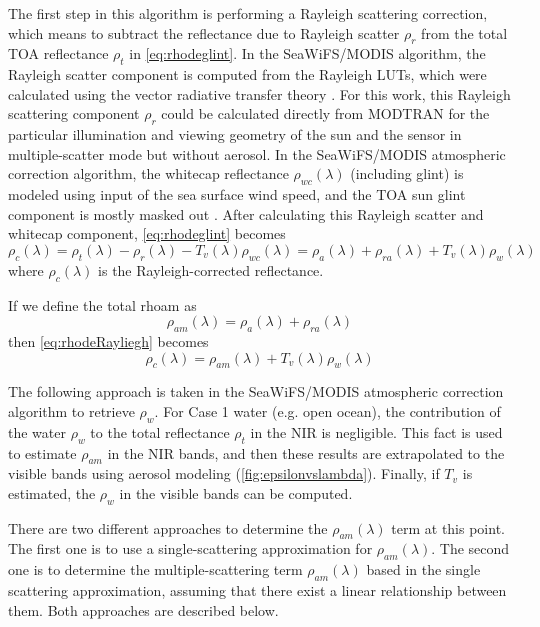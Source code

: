 The first step in this algorithm is performing a Rayleigh scattering correction, which means to subtract the reflectance due to Rayleigh scatter $\rho_r$ from the total TOA reflectance $\rho_t$ in \autoref{eq:rhodeglint}. In the SeaWiFS/MODIS algorithm, the Rayleigh scatter component is computed from the Rayleigh LUTs, which were calculated using the vector radiative transfer theory \cite{Wang:1991,IOCCG:2010}. For this work, this Rayleigh scattering component $\rho_r$ could be calculated directly from MODTRAN for the particular illumination and viewing geometry of the sun and the sensor in multiple-scatter mode but without aerosol. In the SeaWiFS/MODIS atmospheric correction algorithm, the whitecap reflectance $\rho_{wc}(\lambda)$ (including glint) is modeled using input of the sea surface wind speed, and the TOA sun glint component is mostly masked out \cite{IOCCG:2010}. After calculating this Rayleigh scatter and whitecap component, \autoref{eq:rhodeglint} becomes 
\begin{equation}\label{eq:rhodeRayliegh}
 \rho_c(\lambda) = \rho_t(\lambda)-\rho_r(\lambda)-T_v(\lambda)\rho_{wc}(\lambda) = \rho_a(\lambda)+\rho_{ra}(\lambda)+T_v(\lambda)\rho_{w}(\lambda)
\end{equation}
where $\rho_c(\lambda)$ is the Rayleigh-corrected reflectance. 

If we define the total \gls{rhoam} as
\begin{equation}\label{eq:rhoam1}
  \rho_{am}(\lambda) = \rho_a(\lambda)+\rho_{ra}(\lambda)
\end{equation}
then \autoref{eq:rhodeRayliegh} becomes
\begin{equation}\label{eq:rhoam}
 \rho_c(\lambda) = \rho_{am}(\lambda) + T_v(\lambda)\rho_{w}(\lambda)
\end{equation}

The following approach is taken in the SeaWiFS/MODIS atmospheric correction algorithm to retrieve $\rho_w$. For Case 1 water (e.g. open ocean), the contribution of the water $\rho_{w}$ to the total reflectance $\rho_t$ in the NIR is negligible. This fact is used to estimate $\rho_{am}$ in the NIR bands, and then these results are extrapolated to the visible bands using aerosol modeling (\autoref{fig:epsilonvslambda}). Finally, if $T_v$ is estimated, the $\rho_w$ in the visible bands can be computed.

There are two different approaches to determine the $\rho_{am}(\lambda)$ term at this point. The first one is to use a single-scattering approximation for $\rho_{am}(\lambda)$. The second one is to determine the multiple-scattering term $\rho_{am}(\lambda)$ based in the single scattering approximation, assuming that there exist a linear relationship between them. Both approaches are described below.


